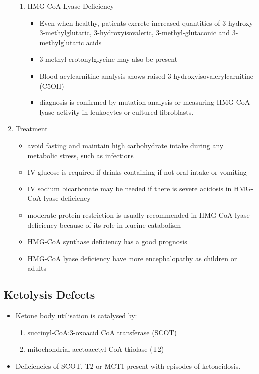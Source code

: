 \documentclass{scrartcl}
\begin{document}
\begin{enumerate}
\begin{enumerate}
\item HMG-CoA Lyase Deficiency
\label{sec:org9a0273f}
\begin{itemize}
\item Even when healthy, patients excrete increased quantities of
3-hydroxy-3-methylglutaric, 3-hydroxyisovaleric, 3-methyl-glutaconic
and 3-methylglutaric acids
\item 3-methyl-crotonylglycine may also be present
\item Blood acylcarnitine analysis shows raised
3-hydroxyisovalerylcarnitine (C5OH)
\item diagnosis is confirmed by mutation analysis or measuring HMG-CoA
lyase activity in leukocytes or cultured fibroblasts.
\end{itemize}
\end{enumerate}

\item Treatment
\label{sec:org8571d6f}
\begin{itemize}
\item avoid fasting and maintain  high carbohydrate intake during any
metabolic stress, such as infections
\item IV glucose is required if drinks containing if not oral intake or vomiting
\item IV sodium bicarbonate may be needed if there is severe acidosis in
HMG-CoA lyase deficiency
\item moderate protein restriction is usually recommended in HMG-CoA
lyase deficiency because of its role in leucine catabolism
\item HMG-CoA synthase deficiency has a good prognosis
\item HMG-CoA lyase deficiency have more encephalopathy as children or adults
\end{itemize}
\end{enumerate}

\subsection{Ketolysis Defects}
\label{sec:orge059b46}
\begin{itemize}
\item Ketone body utilisation is catalysed by:
\begin{enumerate}
\item succinyl-CoA:3-oxoacid CoA transferase (SCOT)
\item mitochondrial acetoacetyl-CoA thiolase (T2)
\end{enumerate}
\item Deficiencies of SCOT, T2 or MCT1 present with episodes of ketoacidosis.
\end{itemize}
\end{document}
